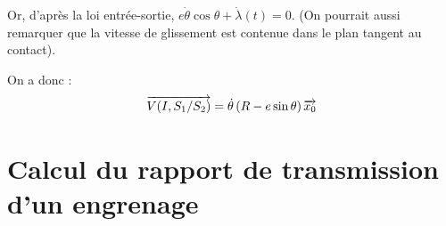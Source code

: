 \documentclass[10pt,oneside]{article}
\begin{document}
Or, d'après la loi entrée-sortie, $e\dot{\theta}\cos \theta +\dot{\lambda}(t)  = 0$. (On pourrait aussi remarquer que la vitesse de glissement est contenue dans le plan tangent au contact).

On a donc :
$$
\overrightarrow{V(I,S_1/S_2)} 
= \dot{\theta}\left(R - e\sin\theta \right) \overrightarrow{x_0} 
$$

%
%
%
%
%


\section{Calcul du rapport de transmission d'un engrenage}
\end{document}
